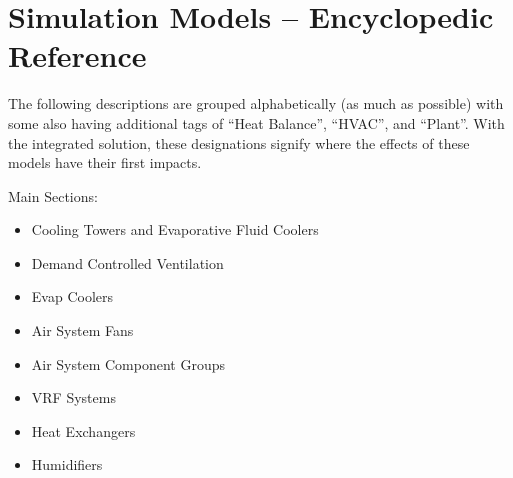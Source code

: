 \chapter{Simulation Models -- Encyclopedic Reference}\label{simulation-models---encyclopedic-reference-002}

The following descriptions are grouped alphabetically (as much as possible) with some also having additional tags of ``Heat Balance'', ``HVAC'', and ``Plant''. With the integrated solution, these designations signify where the effects of these models have their first impacts.

Main Sections:

\begin{itemize}
  \tightlist
  \item Cooling Towers and Evaporative Fluid Coolers
  \item Demand Controlled Ventilation
  \item Evap Coolers
  \item Air System Fans
  \item Air System Component Groups
  \item VRF Systems
  \item Heat Exchangers
  \item Humidifiers 
\end{itemize}
